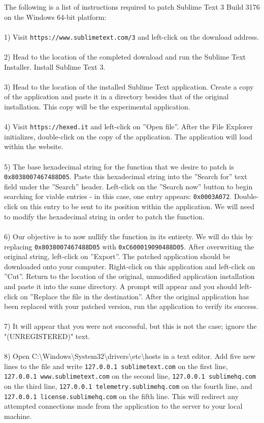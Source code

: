 \documentclass[12pt]{article}
\begin{document}
The following is a list of instructions required to patch Sublime Text 3 Build 3176 on the Windows 64-bit platform: \\ \\
1) Visit \texttt{https://www.sublimetext.com/3} and left-click on the download address. \\ \\
2) Head to the location of the completed download and run the Sublime Text Installer. Install Sublime Text 3. \\ \\
3) Head to the location of the installed Sublime Text application. Create a copy of the application and paste it in a directory besides that of the original installation. This copy will be the experimental application. \\ \\
4) Visit \texttt{https://hexed.it} and left-click on ”Open file”. After the File Explorer initializes, double-click on the copy of the application. The application will load within the website. \\ \\
5) The base hexadecimal string for the function that we desire to patch is \texttt{0x8038007467488D05}. Paste this hexadecimal string into the ”Search for” text field under the ”Search” header. Left-click on the ”Search now” button to begin searching for viable entries - in this case, one entry appears: \texttt{0x0003A072}. Double-click on this entry to be sent to its position within the application. We will need to modify the hexadecimal string in order to patch the function. \\ \\
6) Our objective is to now nullify the function in its entirety. We will do this by replacing \texttt{0x8038007467488D05} with \texttt{0xC600019090488D05}. After overwriting the original string, left-click on ”Export”. The patched application should be downloaded onto your computer. Right-click on this application and left-click on ”Cut”. Return to the location of the original, unmodified application installation and paste it into the same directory. A prompt will appear and you should left-click on ”Replace the file in the destination”. After the original application has been replaced with your patched version, run the application to verify its success. \\ \\
7) It will appear that you were not successful, but this is not the case; ignore the "(UNREGISTERED)" text. \\ \\
8) Open C:\textbackslash Windows\textbackslash System32\textbackslash drivers\textbackslash etc\textbackslash hosts in a text editor. Add five new lines to the file and write \texttt{127.0.0.1 sublimetext.com} on the first line, \texttt{127.0.0.1 www.sublimetext.com} on the second line, \texttt{127.0.0.1 sublimehq.com} on the third line, \texttt{127.0.0.1 telemetry.sublimehq.com} on the fourth line, and \texttt{127.0.0.1 license.sublimehq.com} on the fifth line. This will redirect any attempted connections made from the application to the server to your local machine.
\end{document}
